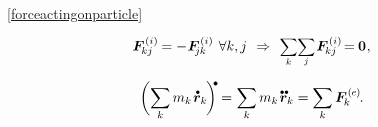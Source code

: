 \begin{minipage}{\linewidth}

~\eqref{forceactingonparticle}

\nopagebreak\begin{equation*}%
\bm{F}^{\smthinternal}_{\hspace{-0.16ex}kj} = - \hspace{.12ex} \bm{F}^{\smthinternal}_{\hspace{-0.4ex}j\hspace{-0.05ex}k}
\hspace{.44em} \forall k,j
\hspace{.4em} \Rightarrow \hspace{.4em}
\scalebox{0.88}{$ \displaystyle\sum_{\smash{k}} $}
\scalebox{0.88}{$ \displaystyle\underset{\raisemath{.2ex}{\smash{j}}}{\sum} $} \hspace{.2ex}
\bm{F}^{\smthinternal}_{\hspace{-0.16ex}kj} \hspace{-0.2ex}
= \hspace{-0.1ex} \bm{0}
\hspace{.1ex} ,
\end{equation*}

\end{minipage}

\vspace{-0.6em}\noindent
{} 

\nopagebreak\ru{\vspace{-0.1em}}\begin{equation}\label{balanceoftranslationalmomentum.discretepoints}
\biggl( \displaystyle\sum_{\smash{k}} m_k \hspace{.2ex} \mathdotabove{\locationvector}_k \hspace{-0.2ex} \biggr)^{\hspace{-0.2em}\tikz[baseline=-0.2ex]\draw[black, fill=black] (0,0) circle (.28ex);} \hspace{-0.15ex}
= \hspace{.1ex} \displaystyle\sum_{\smash{k}} m_k \hspace{.2ex} \mathdotdotabove{\locationvector}_k
= \displaystyle\sum_{\smash{k}} \bm{F}^{\smthexternal}_{\hspace{-0.16ex}k}
\hspace{-0.1ex} .
\end{equation}

